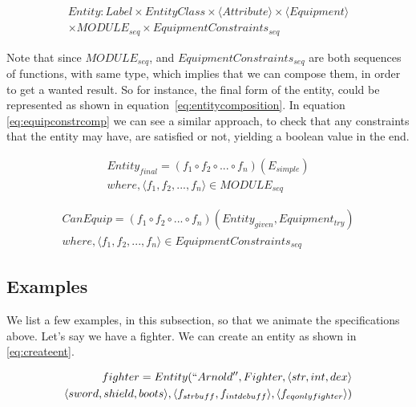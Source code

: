 \begin{equation}
\begin{split}
  \label{eq:entity}
  Entity\colon Label \times
    EntityClass \times
    \langle Attribute \rangle \times
    \langle Equipment \rangle \\
    \times MODULE_{seq} \times EquipmentConstraints_{seq}
\end{split}
\end{equation}

Note that since $MODULE_{seq}$, and $EquipmentConstraints_{seq}$ are both
sequences of functions, with same type, which implies that we can compose them,
in order to get a wanted result. So for instance, the final form of the entity,
could be represented as shown in equation~\ref{eq:entitycomposition}. In
equation \ref{eq:equipconstrcomp} we can see a similar approach, to check that
any constraints that the entity may have, are satisfied or not, yielding a
boolean value in the end.

\begin{equation}
\begin{split}
  \label{eq:entitycomposition}
  Entity_{final} = (f_1 \circ f_2 \circ ... \circ f_n)(E_{simple}) \\
  where, \langle f_1, f_2, ..., f_n \rangle \in MODULE_{seq}
\end{split}
\end{equation}

\begin{equation}
\begin{split}
  \label{eq:equipconstrcomp}
  CanEquip = (f_1 \circ f_2 \circ ... \circ f_n)(Entity_{given}, Equipment_{try}) \\
  where, \langle f_1, f_2, ..., f_n \rangle \in EquipmentConstraints_{seq}
\end{split}
\end{equation}

\subsection{Examples}

We list a few examples, in this subsection, so that we animate the
specifications above. Let's say we have a fighter. We can create an entity as
shown in \ref{eq:createent}.

\begin{equation}
\begin{split}
  \label{eq:createent}
  fighter = Entity(``Arnold'', Fighter, \langle str, int, dex \rangle \\
    \langle sword, shield, boots \rangle, \langle f_{strbuff}, f_{intdebuff}
  \rangle, \langle f_{eqonlyfighter} \rangle)
\end{split}
\end{equation}


